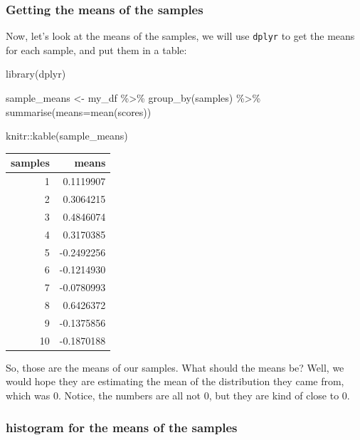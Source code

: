 \documentclass[
]{book}
\newenvironment{Shaded}{\begin{snugshade}}{\end{snugshade}}
\newcommand{\AttributeTok}[1]{\textcolor[rgb]{0.77,0.63,0.00}{#1}}
\newcommand{\FunctionTok}[1]{\textcolor[rgb]{0.00,0.00,0.00}{#1}}
\newcommand{\NormalTok}[1]{#1}
\newcommand{\OtherTok}[1]{\textcolor[rgb]{0.56,0.35,0.01}{#1}}
\newcommand{\SpecialCharTok}[1]{\textcolor[rgb]{0.00,0.00,0.00}{#1}}
\begin{document}
\hypertarget{getting-the-means-of-the-samples}{%
\subsubsection{Getting the means of the samples}\label{getting-the-means-of-the-samples}}

Now, let's look at the means of the samples, we will use \texttt{dplyr} to get the means for each sample, and put them in a table:

\begin{Shaded}
\begin{Highlighting}[]
\FunctionTok{library}\NormalTok{(dplyr)}

\NormalTok{sample\_means }\OtherTok{\textless{}{-}}\NormalTok{ my\_df }\SpecialCharTok{\%\textgreater{}\%}
                \FunctionTok{group\_by}\NormalTok{(samples) }\SpecialCharTok{\%\textgreater{}\%}
                \FunctionTok{summarise}\NormalTok{(}\AttributeTok{means=}\FunctionTok{mean}\NormalTok{(scores))}

\NormalTok{knitr}\SpecialCharTok{::}\FunctionTok{kable}\NormalTok{(sample\_means)}
\end{Highlighting}
\end{Shaded}

\begin{tabular}{r|r}
\hline
samples & means\\
\hline
1 & 0.1119907\\
\hline
2 & 0.3064215\\
\hline
3 & 0.4846074\\
\hline
4 & 0.3170385\\
\hline
5 & -0.2492256\\
\hline
6 & -0.1214930\\
\hline
7 & -0.0780993\\
\hline
8 & 0.6426372\\
\hline
9 & -0.1375856\\
\hline
10 & -0.1870188\\
\hline
\end{tabular}

So, those are the means of our samples. What should the means be? Well, we would hope they are estimating the mean of the distribution they came from, which was 0. Notice, the numbers are all not 0, but they are kind of close to 0.

\hypertarget{histogram-for-the-means-of-the-samples}{%
\subsubsection{histogram for the means of the samples}\label{histogram-for-the-means-of-the-samples}}
\end{document}
